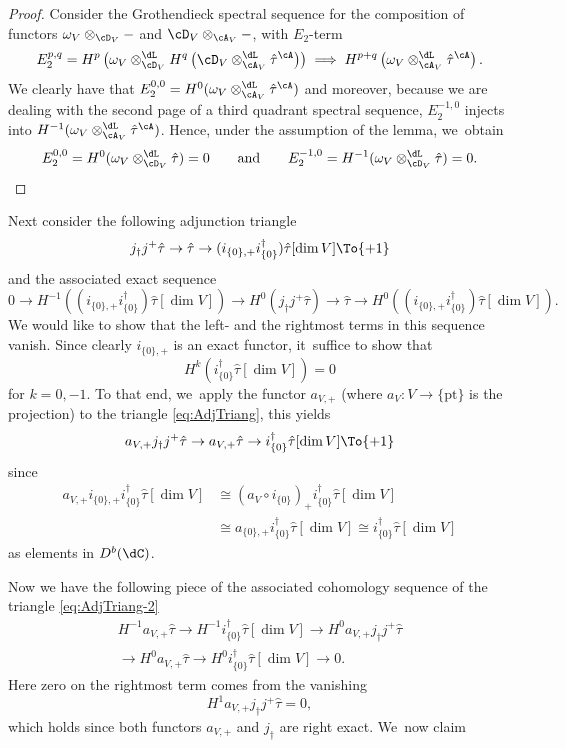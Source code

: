 \begin{proof}
Consider the Grothendieck spectral sequence for the composition of functors
$\omega_V \otimes_{\cD_V} - $ and $\cD_V\otimes_{\cA_V} -$, with $E_2$-term
\[
E_2^{p,q} = H^p\left(\omega_V \otimes_{\cD_V}^\dL H^q \left(\cD_V\otimes^\dL_{\cA_V} \hat{\tau}^\cA\right)\right) \implies
H^{p+q}\left(\omega_V\otimes^\dL_{\cA_V} \hat{\tau}^\cA\right).
\]
We clearly have that $E_2^{0,0}=H^0(\omega_V\otimes^\dL_{\cA_V} \hat{\tau}^\cA)$ and moreover, because we are dealing with the second page of a third quadrant spectral sequence, $E_2^{-1,0}$ injects into
$H^{-1}(\omega_V\otimes^\dL_{\cA_V} \hat{\tau}^\cA)$. Hence, under the assumption of the lemma, we~obtain
\[
E_2^{0,0} = H^0(\omega_V \otimes^\dL_{\cD_V} \hat{\tau}) =0
\quad\quad
\textup{and}
\quad\quad
E_2^{-1,0} = H^{-1}(\omega_V \otimes^\dL_{\cD_V} \hat{\tau}) =0.\qedhere
\]
\end{proof}

Next consider the following adjunction triangle
\begin{equation}\label{eq:AdjTriang}
j_\dag j^+ \hat\tau \to \hat\tau \to
(i_{\{0\},+} i_{\{0\}}^\dag)\hat\tau[\dim V] \To{+1}
\end{equation}
and the associated exact sequence
\[
0
\to H^{-1}((i_{\{0\},+} i_{\{0\}}^\dag)\hat\tau[\dim V])
\to H^0(j_\dag j^+ \hat\tau)
\to \hat\tau
\to H^0((i_{\{0\},+} i_{\{0\}}^\dag)\hat\tau[\dim V]).
\]
We would like to show that the left- and the rightmost terms in this sequence vanish.
Since clearly $i_{\{0\},+}$ is an exact functor, it~suffice to show that
\[
H^k(i_{\{0\}}^\dag\hat{\tau}[\dim V])=0
\]
for $k=0,-1$. To that end, we~apply the functor $a_{V,+}$ (where
$a_V\colon V\to \{\mathrm{pt}\}$ is the projection) to the triangle
\eqref{eq:AdjTriang}, this yields
\begin{equation}\label{eq:AdjTriang-2}
a_{V,+}j_\dag j^+ \hat\tau \to a_{V,+}\hat\tau \to
i_{\{0\}}^\dag \hat\tau[\dim V] \To{+1}
\end{equation}
since
\begin{align*}
a_{V,+} i_{\{0\},+} i_{\{0\}}^\dag \hat\tau[\dim V] &\cong 
(a_V\circ i_{\{0\}})_+ i_{\{0\}}^\dag \hat\tau[\dim V] \\
&\cong a_{\{0\},+} i_{\{0\}}^\dag \hat\tau[\dim V] \cong
i_{\{0\}}^\dag \hat\tau[\dim V]
\end{align*}
as elements in $D^b(\dC)$.

Now we have the following piece of the associated cohomology sequence of the triangle \eqref{eq:AdjTriang-2}
\begin{multline}\label{eq:CohomSequenceAv}
H^{-1} a_{V,+} \hat\tau
\to H^{-1} i_{\{0\}}^\dag \hat\tau[\dim V]
\to H^0 a_{V,+} j_\dag j^+ \hat\tau \\
\to H^0 a_{V,+} \hat\tau
\to H^0 i_{\{0\}}^\dag\hat\tau[\dim V]
\to 0.
\end{multline}
Here zero on the rightmost term comes from the vanishing
\[
H^1 a_{V,+} j_\dag j^+ \hat\tau=0,
\]
which holds since both functors $a_{V,+}$ and $j_\dag $ are right exact. We~now claim


